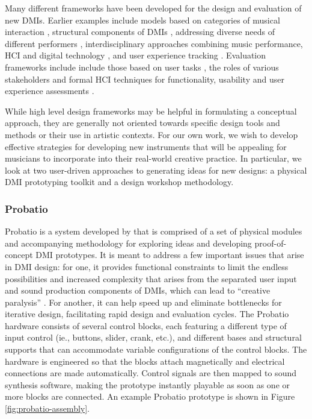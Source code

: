 \documentclass[letterpaper, 12pt]{article}
\begin{document}
Many different frameworks have been developed for the design and evaluation of new DMIs. Earlier examples include models based on categories of musical interaction \citep{Bongers2000a}, structural components of DMIs \citep{Wanderley2004}, addressing diverse needs of different performers \citep{Jorda2004, Jorda2004b}, interdisciplinary approaches combining music performance, HCI and digital technology \citep{Overholt2009}, and user experience tracking \citep{fmorreale:2014}. Evaluation frameworks include include those based on user tasks \citep{Wanderley2002}, the roles of various stakeholders \citep{OModhrain2011a} and formal HCI techniques for functionality, usability and user experience assessments \citep{Young2015a}.


While high level design frameworks may be helpful in formulating a conceptual approach, they are generally not oriented towards specific design tools and methods or their use in artistic contexts. For our own work, we wish to develop effective strategies for developing new instruments that will be appealing for musicians to incorporate into their real-world creative practice. In particular, we look at two user-driven approaches to generating ideas for new designs: a physical DMI prototyping toolkit and a design workshop methodology. 

\subsubsection{Probatio}
\label{sec:probatio}

Probatio is a system developed by \citet{Calegario2017} that is comprised of a set of physical modules and accompanying methodology for exploring ideas and developing proof-of-concept DMI prototypes. It is meant to address a few important issues that arise in DMI design: for one, it provides functional constraints to limit the endless possibilities and increased complexity that arises from the separated user input and sound production components of DMIs, which can lead to ``creative paralysis'' \citep{Magnusson2010}. For another, it can help speed up and eliminate bottlenecks for iterative design, facilitating rapid design and evaluation cycles. The Probatio hardware consists of several control blocks, each featuring a different type of input control (ie., buttons, slider, crank, etc.), and different bases and structural supports that can accommodate variable configurations of the control blocks. The hardware is engineered so that the blocks attach magnetically and electrical connections are made automatically. Control signals are then mapped to sound synthesis software, making the prototype instantly playable as soon as one or more blocks are connected. An example Probatio prototype is shown in Figure \ref{fig:probatio-assembly}.
\end{document}
